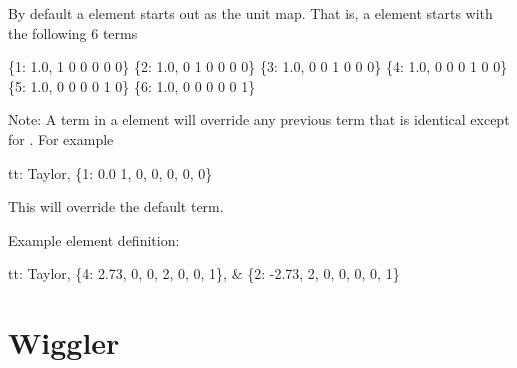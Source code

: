 {{By default a  element starts out as the unit map. 
That is, a  element starts with the following 6 terms
\begin{example}
  \{1: 1.0, 1 0 0 0 0 0\}
  \{2: 1.0, 0 1 0 0 0 0\}
  \{3: 1.0, 0 0 1 0 0 0\}
  \{4: 1.0, 0 0 0 1 0 0\}
  \{5: 1.0, 0 0 0 0 1 0\}
  \{6: 1.0, 0 0 0 0 0 1\}
\end{example}
Note: A term in a  element will override any previous term
that is identical except for . For example
\begin{example}
  tt: Taylor, \{1:  0.0   1, 0, 0, 0, 0, 0\} 
\end{example}
This will override the default  term.

Example  element definition:
\begin{example}
  tt: Taylor, \{4:  2.73, 0, 0, 2, 0, 0, 1\}, &
              \{2: -2.73, 2, 0, 0, 0, 0, 1\}
\end{example}

\section{Wiggler} 
\label{s:wiggler}

}}
